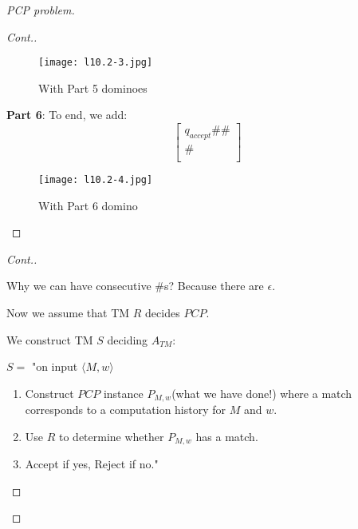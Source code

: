 \begin{proof}[PCP problem]
\begin{proof}[Cont.]
        \begin{figure}[H]
            \centering
            \texttt{[image: l10.2-3.jpg]}
            \caption{With Part 5 dominoes}
        \end{figure}

        \textbf{Part 6}: To end, we add:
        \[
            \begin{bmatrix}
                 q_{accept} \# \# \\
                 \# \\
            \end{bmatrix}
        \] 
        \begin{figure}[H]
            \centering
            \texttt{[image: l10.2-4.jpg]}
            \caption{With Part 6 domino}
        \end{figure}
    \end{proof}
    \newpage
    \begin{proof}[Cont.]
        \begin{remark}
            Why we can have consecutive \(\#\)s? Because there are \(\epsilon\).  
        \end{remark}

        Now we assume that TM \(R\) decides \(PCP\).  

        We construct TM \(S\) deciding \(A_{TM}\):

        \(S =\) "on input \(\langle M, w\rangle\)
            \begin{enumerate}
                \item Construct \(PCP\) instance \(P_{M, w}\)(what we have done!) where a match corresponds to a computation history for \(M\) and \(w\).   
                \item Use \(R\) to determine whether \(P_{M, w}\) has a match.  
                \item Accept if yes, Reject if no."
            \end{enumerate}
    \end{proof}
\end{proof}


